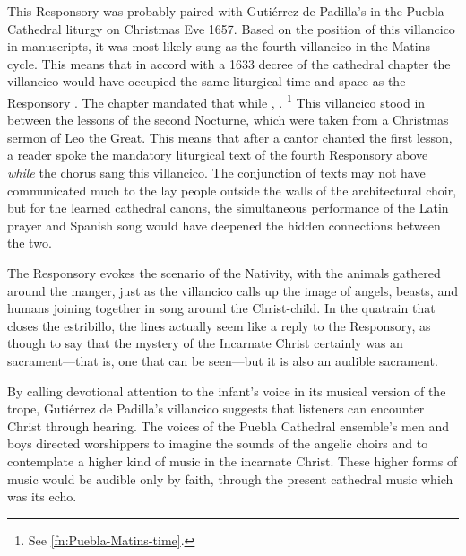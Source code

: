 This Responsory was probably paired with Gutiérrez de Padilla's  in the Puebla Cathedral liturgy on Christmas Eve 1657.
Based on the position of this villancico in manuscripts, it was most likely
sung as the fourth villancico in the Matins cycle.
This means that in accord with a 1633 decree of the cathedral chapter the
villancico would have occupied the same liturgical time and space as the
Responsory .
The chapter mandated that while , .%
    \footnote{See \cref{fn:Puebla-Matins-time}.}
This villancico stood in between the lessons of the second Nocturne, which were
taken from a Christmas sermon of Leo the Great.
This means that after a cantor chanted the first lesson, a reader spoke the
mandatory liturgical text of the fourth Responsory above \emph{while} the chorus
sang this villancico.
The conjunction of texts may not have communicated much to the lay people
outside the walls of the architectural choir, but for the learned cathedral
canons, the simultaneous performance of the Latin prayer and Spanish song would
have deepened the hidden connections between the two.

The Responsory evokes the scenario of the Nativity, with the animals gathered
around the manger, just as the villancico calls up the image of angels, beasts,
and humans joining together in song around the Christ-child.
In the quatrain that closes the estribillo, the lines  actually seem like a reply to the Responsory,
as though to say that the mystery of the Incarnate Christ certainly was an
 sacrament---that is, one that can be seen---but it is also
an audible sacrament.

By calling devotional attention to the infant's voice in its musical version of
the  trope, Gutiérrez de Padilla's villancico suggests that
listeners can encounter Christ through hearing.
The voices of the Puebla Cathedral ensemble's men and boys directed worshippers
to imagine the sounds of the angelic choirs and to contemplate a higher kind of
music in the incarnate Christ.
These higher forms of music would be audible only by faith, through the present
cathedral music which was its echo.

